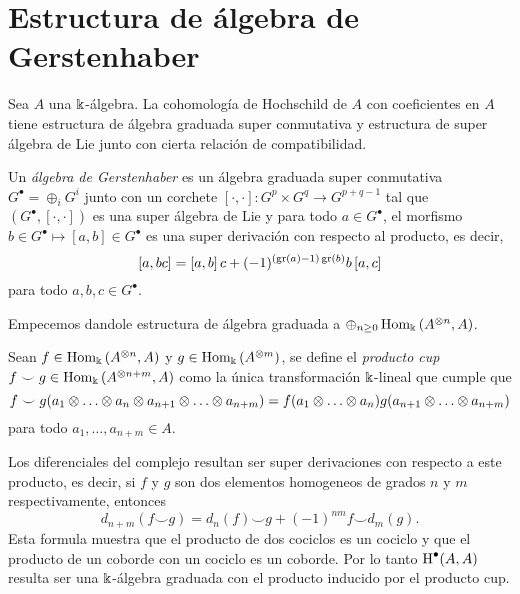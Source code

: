 \documentclass[a4paper,oneside,fleqn,11pt,../tesis.tex]{subfiles}
\begin{document}
\section{Estructura de álgebra de Gerstenhaber}\label{hochschild_gerstenhaber}

Sea $A$ una $\Bbbk$-álgebra. La cohomología de Hochschild de $A$ con coeficientes en $A$ tiene estructura
de álgebra graduada super conmutativa y estructura de super álgebra de Lie junto con cierta relación de compatibilidad.

\begin{definition}
	Un \emph{álgebra de Gerstenhaber} es un álgebra graduada super conmutativa $G^{\bullet} = \oplus_{i}G^i$ junto con
	un corchete $\left[\cdot, \cdot \right]: G^{p} \times G^{q} \to G^{p + q - 1}$
	tal que $\left(G^{\bullet}, \left[\cdot, \cdot \right]\right)$ es una super álgebra de Lie y para todo $a \in G^{\bullet}$,
	el morfismo $b \in G^{\bullet} \mapsto \left[a,b\right] \in G^{\bullet}$
	es una super derivación con respecto al producto, es decir,
	\[
		\left[a, b c\right] = \left[a,b\right]c + (-1)^{(\operatorname{gr}(a) - 1)\operatorname{gr}(b)}b\left[a, c\right]
	\]
	para todo $a, b, c \in G^{\bullet}$.
\end{definition}

Empecemos dandole estructura de álgebra graduada a $\oplus_{n \geq 0}\operatorname{Hom}_{\Bbbk}\left(A^{\otimes n}, A\right)$.
\begin{definition}
	Sean $f \in \operatorname{Hom}_{\Bbbk}\left(A^{\otimes n}, A\right)$ y $g \in \operatorname{Hom}_{\Bbbk}\left(A^{\otimes m}\right)$, se define el \emph{producto cup}
	$f \smile g \in \operatorname{Hom}_{\Bbbk}\left(A^{\otimes n + m}, A\right)$ como la única transformación $\Bbbk$-lineal que cumple que
	\[
		f\smile g(a_1\otimes \ldots \otimes a_n \otimes a_{n + 1} \otimes \ldots \otimes a_{n + m}) = f(a_1\otimes \ldots \otimes a_n)g(a_{n + 1} \otimes \ldots \otimes a_{n + m})
	\]
	para todo $a_1, \ldots, a_{n + m} \in A$.
\end{definition}
Los diferenciales del complejo resultan ser super derivaciones con respecto a este producto, es decir, si $f$ y $g$ son dos
elementos homogeneos de grados $n$ y $m$ respectivamente, entonces
\[
	d_{n + m}(f \smile g) = d_{n}(f) \smile g + (-1)^{nm}f \smile d_{m}(g).
\]
Esta formula muestra que el producto de dos cociclos es un cociclo y que el producto de un coborde con un cociclo
es un coborde. Por lo tanto $\operatorname{H}^{\bullet}(A,A)$ resulta ser una $\Bbbk$-álgebra graduada con el producto inducido por el producto cup.
\end{document}
